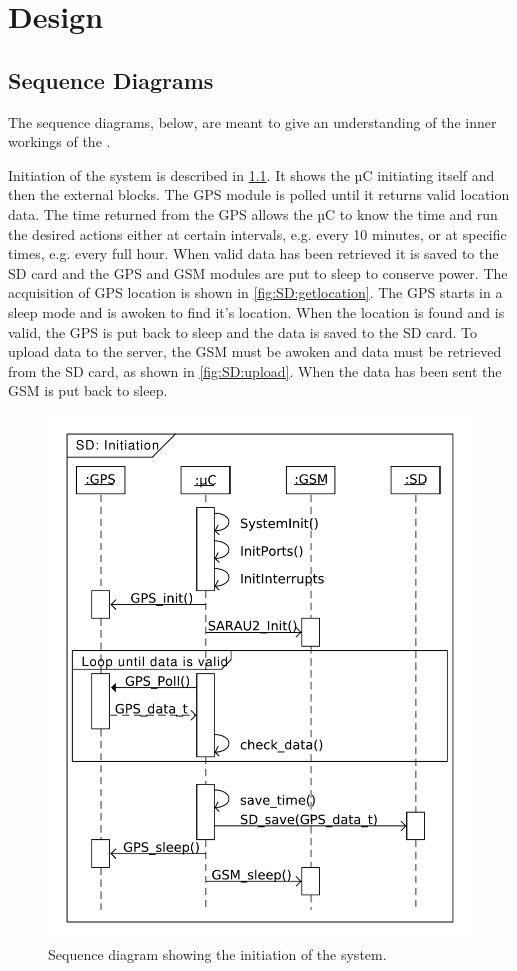 
\chapter{Design}
\label{ch:Design}

\section{Sequence Diagrams}
The sequence diagrams,  below, are meant to give an understanding of the inner workings of the \systemName.

Initiation of the system is described in \cref{fig:SD:init}.
It shows the µC initiating itself and then the external blocks.
The GPS module is polled until it returns valid location data. The time returned from the GPS allows the µC to know the time and run the desired actions either at certain intervals, e.g. every 10 minutes, or at specific times, e.g. every full hour.
When valid data has been retrieved it is saved to the SD card and the GPS and GSM modules are put to sleep to conserve power.
The acquisition of GPS location is shown in \cref{fig:SD:getlocation}.
The GPS starts in a sleep mode and is awoken to find it's location.
When the location is found and is valid, the GPS is put back to sleep and the data is saved to the SD card.
To upload data to the server, the GSM must be awoken and data must be retrieved from the SD card, as shown in \cref{fig:SD:upload}.
When the data has been sent the GSM is put back to sleep.

\begin{figure}
	\centering
	\includegraphics[width=0.7\linewidth]{gfx/Design/SD_init.pdf}
	\caption{Sequence diagram showing the initiation of the system.}
	\label{fig:SD:init}
\end{figure}

